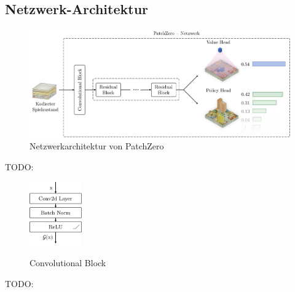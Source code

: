 \subsection{Netzwerk-Architektur}

\cite[Anhang]{2017.AlphaGoZeroPaper}
\cite[Anhang, S. 10]{2017.AlphaGoZeroPaper}

\cite{2018.Lc0AlphaZero}
\cite{2019.SqueezeandExcitation}
\cite{2020.Lc0NetworkTopology}

\begin{figure}[!ht]
    \centering
    \includegraphics[width=\textwidth]{res/pictures/patch-zero-architecture.pdf}
    \caption{Netzwerkarchitektur von PatchZero}
    \label{fig:patch-zero-architecture}
\end{figure}

TODO:

\begin{figure}
    \includegraphics[width=0.2\textwidth]{res/pictures/conv-block.pdf}
    \centering
    \caption[Convolutional Block]{\unskip}
    Convolutional Block
    \label{fig:conv-block}
\end{figure}

TODO:

